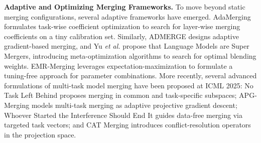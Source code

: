 \documentclass{article}
\newcommand{\etal}{\textit{et al.}}
\begin{document}
\textbf{Adaptive and Optimizing Merging Frameworks.} To move beyond static merging configurations, several adaptive frameworks have emerged. AdaMerging \cite{yang2024adamerging} formulates task-wise coefficient optimization to search for layer-wise merging coefficients on a tiny calibration set. Similarly, ADMERGE \cite{admerge2023} designs adaptive gradient-based merging, and Yu \etal \cite{yu2024language} propose that Language Models are Super Mergers, introducing meta-optimization algorithms to search for optimal blending weights. EMR-Merging \cite{emrmerging2024} leverages expectation-maximization to formulate a tuning-free approach for parameter combinations. More recently, several advanced formulations of multi-task model merging have been proposed at ICML 2025: No Task Left Behind \cite{notaskleftbehind2025} proposes merging in common and task-specific subspaces; APG-Merging \cite{apgmerging2025} models multi-task merging as adaptive projective gradient descent; Whoever Started the Interference Should End It \cite{whoeverstarted2025} guides data-free merging via targeted task vectors; and CAT Merging \cite{catmerging2025} introduces conflict-resolution operators in the projection space.
\end{document}
